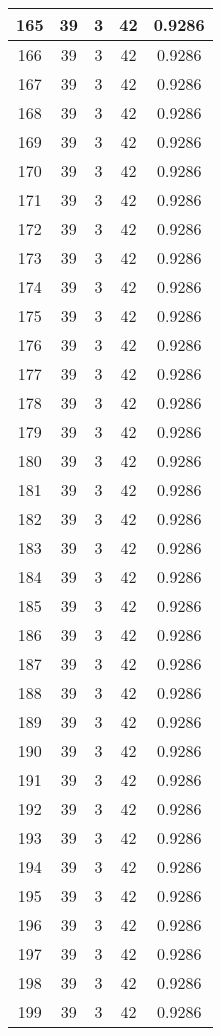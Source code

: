 \documentclass[letterpaper, 12pt]{article}
\begin{document}
\begin{longtable}{|c|c|c|c|c|}
\hline
165 & 39 & 3 & 42 & 0.9286 \\
\hline
166 & 39 & 3 & 42 & 0.9286 \\
\hline
167 & 39 & 3 & 42 & 0.9286 \\
\hline
168 & 39 & 3 & 42 & 0.9286 \\
\hline
169 & 39 & 3 & 42 & 0.9286 \\
\hline
170 & 39 & 3 & 42 & 0.9286 \\
\hline
171 & 39 & 3 & 42 & 0.9286 \\
\hline
172 & 39 & 3 & 42 & 0.9286 \\
\hline
173 & 39 & 3 & 42 & 0.9286 \\
\hline
174 & 39 & 3 & 42 & 0.9286 \\
\hline
175 & 39 & 3 & 42 & 0.9286 \\
\hline
176 & 39 & 3 & 42 & 0.9286 \\
\hline
177 & 39 & 3 & 42 & 0.9286 \\
\hline
178 & 39 & 3 & 42 & 0.9286 \\
\hline
179 & 39 & 3 & 42 & 0.9286 \\
\hline
180 & 39 & 3 & 42 & 0.9286 \\
\hline
181 & 39 & 3 & 42 & 0.9286 \\
\hline
182 & 39 & 3 & 42 & 0.9286 \\
\hline
183 & 39 & 3 & 42 & 0.9286 \\
\hline
184 & 39 & 3 & 42 & 0.9286 \\
\hline
185 & 39 & 3 & 42 & 0.9286 \\
\hline
186 & 39 & 3 & 42 & 0.9286 \\
\hline
187 & 39 & 3 & 42 & 0.9286 \\
\hline
188 & 39 & 3 & 42 & 0.9286 \\
\hline
189 & 39 & 3 & 42 & 0.9286 \\
\hline
190 & 39 & 3 & 42 & 0.9286 \\
\hline
191 & 39 & 3 & 42 & 0.9286 \\
\hline
192 & 39 & 3 & 42 & 0.9286 \\
\hline
193 & 39 & 3 & 42 & 0.9286 \\
\hline
194 & 39 & 3 & 42 & 0.9286 \\
\hline
195 & 39 & 3 & 42 & 0.9286 \\
\hline
196 & 39 & 3 & 42 & 0.9286 \\
\hline
197 & 39 & 3 & 42 & 0.9286 \\
\hline
198 & 39 & 3 & 42 & 0.9286 \\
\hline
199 & 39 & 3 & 42 & 0.9286 \\
\hline
\end{longtable}
\end{document}
